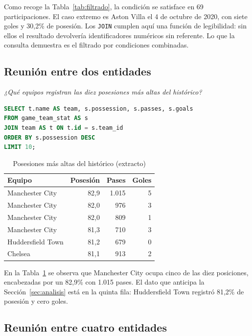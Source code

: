 \documentclass[conference]{IEEEtran}
\begin{document}
Como recoge la Tabla~\ref{tab:filtrado}, la condición se satisface en 69
participaciones. El caso extremo es Aston Villa el 4 de octubre de 2020, con
siete goles y 30,2\% de posesión. Los \texttt{JOIN} cumplen aquí una función de
legibilidad: sin ellos el resultado devolvería identificadores numéricos sin
referente. Lo que la consulta demuestra es el filtrado por condiciones
combinadas.

\subsection{Reunión entre dos entidades}

\emph{¿Qué equipos registran las diez posesiones más altas del histórico?}

\begin{lstlisting}[language=SQL]
SELECT t.name AS team, s.possession, s.passes, s.goals
FROM game_team_stat AS s
JOIN team AS t ON t.id = s.team_id
ORDER BY s.possession DESC
LIMIT 10;
\end{lstlisting}

\begin{table}[htbp]
\caption{Posesiones más altas del histórico (extracto)}
\label{tab:posesion}
\centering
\begin{tabular}{lrrr}
\toprule
\textbf{Equipo} & \textbf{Posesión} & \textbf{Pases} & \textbf{Goles} \\
\midrule
Manchester City   & 82,9 & 1.015 & 5 \\
Manchester City   & 82,0 & 976   & 3 \\
Manchester City   & 82,0 & 809   & 1 \\
Manchester City   & 81,3 & 710   & 3 \\
Huddersfield Town & 81,2 & 679   & 0 \\
Chelsea           & 81,1 & 913   & 2 \\
\bottomrule
\end{tabular}
\end{table}

En la Tabla~\ref{tab:posesion} se observa que Manchester City ocupa cinco de
las diez posiciones, encabezadas por un 82,9\% con 1.015 pases. El dato que
anticipa la Sección~\ref{sec:analisis} está en la quinta fila: Huddersfield
Town registró 81,2\% de posesión y cero goles.

\subsection{Reunión entre cuatro entidades}
\end{document}
